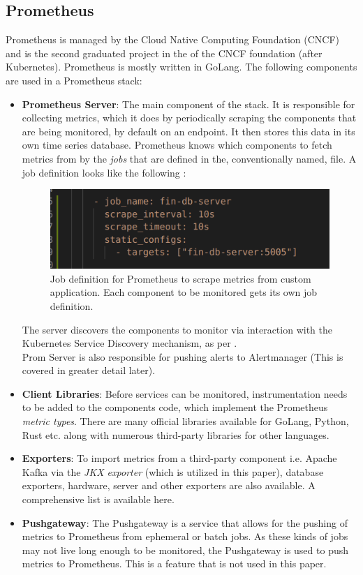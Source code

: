 \subsection{Prometheus}
Prometheus is managed by the Cloud Native Computing Foundation (CNCF)\autocite{CloudNativeComputinga} and is the second graduated project in the
of the CNCF foundation (after Kubernetes). Prometheus is mostly written in GoLang. The following components are used in a Prometheus stack:
\begin{itemize}
	\item \textbf{Prometheus Server}: The main component of the stack. It is responsible for collecting metrics, which it
	      does by periodically scraping the components that are being monitored, by default on an  endpoint. It
	      then stores this data in its own time series database. Prometheus knows which components to fetch metrics from by
	      the \emph{jobs} that are defined in the, conventionally named,  file. A job definition looks like
	      the following :
	      \begin{figure}[H]
		      \centering
		      \includegraphics[width=.6\linewidth]{figures/prom-job.png}
		      \caption{Job definition for Prometheus to scrape metrics from custom application. Each component to be monitored
			      gets its own job definition.}
		      \label{fig:prom-job}
	      \end{figure}
	      The server discovers the components to monitor via interaction with the Kubernetes Service Discovery mechanism, as per .\\
	      Prom Server is also responsible for pushing alerts to Alertmanager (This is covered in greater detail later).
	\item \textbf{Client Libraries}: Before services can be monitored, instrumentation needs to be added to
	      the components code, which implement the Prometheus \emph{metric types}. There are many official libraries available
	      for GoLang, Python, Rust etc. along with numerous third-party libraries for other languages\autocite{prometheusClientLibrariesPrometheus}.
	\item \textbf{Exporters}: To import metrics from a third-party component i.e. Apache Kafka via the \emph{JKX exporter} (which is utilized
	      in this paper), database exporters, hardware, server and other exporters are also available. A comprehensive list is available here\autocite{prometheusExportersIntegrationsPrometheus}.
	\item \textbf{Pushgateway}: The Pushgateway is a service that allows for the pushing of metrics to Prometheus from ephemeral or batch jobs. As
	      these kinds of jobs may not live long enough to be monitored, the Pushgateway is used to push metrics to Prometheus. This is a feature that is
	      not used in this paper.
\end{itemize}
